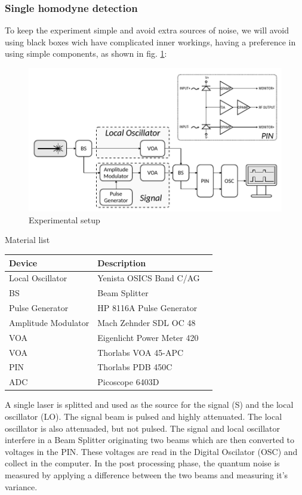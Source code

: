 \subsubsection{Single homodyne detection}
%
To keep the experiment simple and avoid extra sources of noise, we will avoid using black boxes wich have complicated inner workings, having a preference in using simple components, as shown in fig. \ref{fig:experimental_homodyne_setup}:
\\
\begin{figure}[H]
	\centering
	\includegraphics{./sdf/optical_detection/figures/scheme_experimental.pdf}
	\caption{Experimental setup}
	\label{fig:experimental_homodyne_setup}
\end{figure}
%
%
Material list
\begin{table}[H]
	\centering
	\begin{tabulary}{1.0\textwidth}{|L|L|l|}
		\hline
		\textbf{Device}		& \textbf{Description}\\
		\hline
		Local Oscillator	& Yenista OSICS Band C/AG\\
		\hline
		BS					& Beam Splitter\\
		\hline
		Pulse Generator		& HP 8116A Pulse Generator\\
		\hline
		Amplitude Modulator	& Mach Zehnder SDL OC 48\\
		\hline
		VOA					& Eigenlicht Power Meter 420\\
		\hline
		VOA					& Thorlabs VOA 45-APC\\
		\hline
		PIN					& Thorlabs PDB 450C\\
		\hline
		ADC					& Picoscope 6403D\\
		\hline
	\end{tabulary}
\end{table}
%
A single laser is splitted and used as the source for the signal (S) and the local oscillator (LO). The signal beam is pulsed and highly attenuated. The local oscillator is also attenuaded, but not pulsed. The signal and local oscillator interfere in a Beam Splitter originating two beams which are then converted to voltages in the PIN. These voltages are read in the Digital Oscilator (OSC) and collect in the computer. In the post processing phase, the quantum noise is measured by applying a difference between the two beams and measuring it's variance.
